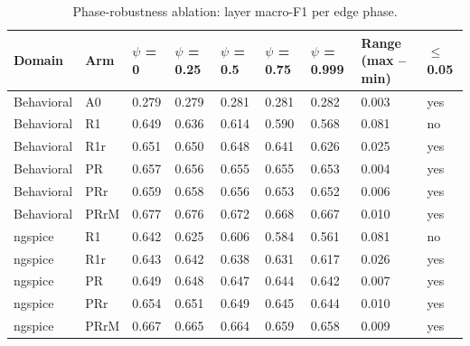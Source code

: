 \begin{table}[H]
\caption{Phase-robustness ablation: layer macro-F1 per edge phase.\label{tab:table08_phase_ablation}}
\centering
\footnotesize
\begin{tabular}{p{3.2cm}p{1.4cm}p{1.4cm}p{1.4cm}p{1.4cm}p{1.4cm}p{1.4cm}p{1.4cm}p{1.4cm}}
\toprule
\textbf{Domain} & \textbf{Arm} & \textbf{$\psi$ = 0} & \textbf{$\psi$ = 0.25} & \textbf{$\psi$ = 0.5} & \textbf{$\psi$ = 0.75} & \textbf{$\psi$ = 0.999} & \textbf{Range (max -- min)} & \textbf{$\leq$ 0.05} \\
\midrule
Behavioral & A0 & 0.279 & 0.279 & 0.281 & 0.281 & 0.282 & 0.003 & yes \\
Behavioral & R1 & 0.649 & 0.636 & 0.614 & 0.590 & 0.568 & 0.081 & no \\
Behavioral & R1r & 0.651 & 0.650 & 0.648 & 0.641 & 0.626 & 0.025 & yes \\
Behavioral & PR & 0.657 & 0.656 & 0.655 & 0.655 & 0.653 & 0.004 & yes \\
Behavioral & PRr & 0.659 & 0.658 & 0.656 & 0.653 & 0.652 & 0.006 & yes \\
Behavioral & PRrM & 0.677 & 0.676 & 0.672 & 0.668 & 0.667 & 0.010 & yes \\
ngspice & R1 & 0.642 & 0.625 & 0.606 & 0.584 & 0.561 & 0.081 & no \\
ngspice & R1r & 0.643 & 0.642 & 0.638 & 0.631 & 0.617 & 0.026 & yes \\
ngspice & PR & 0.649 & 0.648 & 0.647 & 0.644 & 0.642 & 0.007 & yes \\
ngspice & PRr & 0.654 & 0.651 & 0.649 & 0.645 & 0.644 & 0.010 & yes \\
ngspice & PRrM & 0.667 & 0.665 & 0.664 & 0.659 & 0.658 & 0.009 & yes \\
\bottomrule
\end{tabular}
\par\vspace{2pt}
\end{table}

